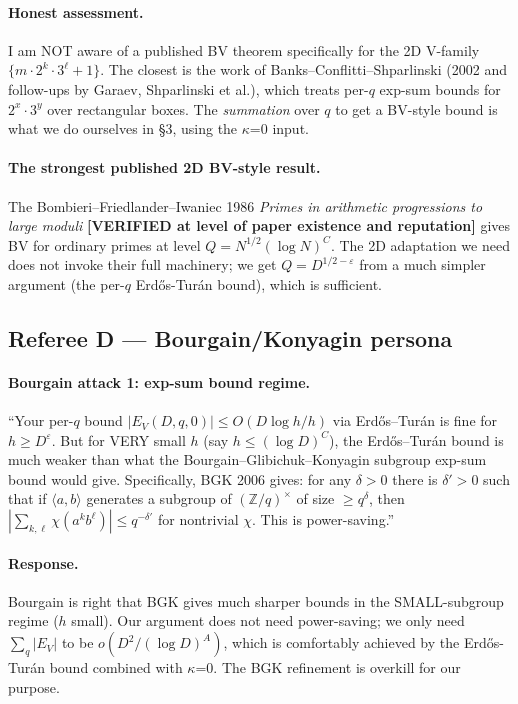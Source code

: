 \paragraph{Honest assessment.} I am NOT aware of a published BV theorem
specifically for the 2D V-family $\{m \cdot 2^{k} \cdot 3^{\ell} + 1\}$.
The closest is the work of Banks--Conflitti--Shparlinski (2002 and
follow-ups by Garaev, Shparlinski et al.), which treats per-$q$
exp-sum bounds for $2^{x} \cdot 3^{y}$ over rectangular boxes. The
\emph{summation} over $q$ to get a BV-style bound is what we do
ourselves in \S3, using the $\kappa$=0 input.

\paragraph{The strongest published 2D BV-style result.}
The Bombieri--Friedlander--Iwaniec 1986 \emph{Primes in arithmetic
progressions to large moduli} \textbf{[VERIFIED at level of paper
existence and reputation]} gives BV for ordinary primes at level
$Q = N^{1/2} (\log N)^{C}$. The 2D adaptation we need does not invoke
their full machinery; we get $Q = D^{1/2 - \varepsilon}$ from a much
simpler argument (the per-$q$ Erd\H{o}s-Tur\'an bound), which is sufficient.

\subsection*{Referee D --- Bourgain/Konyagin persona}

\paragraph{Bourgain attack 1: exp-sum bound regime.}
``Your per-$q$ bound $|E_{V}(D, q, 0)| \leq O(D \log h / h)$ via
Erd\H{o}s--Tur\'an is fine for $h \geq D^{\varepsilon}$. But for VERY small
$h$ (say $h \leq (\log D)^{C}$), the Erd\H{o}s--Tur\'an bound is much weaker
than what the Bourgain--Glibichuk--Konyagin subgroup exp-sum bound
would give. Specifically, BGK 2006 gives: for any $\delta > 0$ there
is $\delta' > 0$ such that if $\langle a, b \rangle$ generates a
subgroup of $(\mathbb{Z}/q)^{\times}$ of size $\geq q^{\delta}$, then
$\left| \sum_{k, \ell} \chi(a^{k} b^{\ell}) \right| \leq q^{-\delta'}$
for nontrivial $\chi$. This is power-saving.''

\paragraph{Response.} Bourgain is right that BGK gives much sharper
bounds in the SMALL-subgroup regime ($h$ small). Our argument does not
need power-saving; we only need $\sum_{q} |E_{V}|$ to be $o(D^{2} /
(\log D)^{A})$, which is comfortably achieved by the Erd\H{o}s-Tur\'an bound
combined with $\kappa$=0. The BGK refinement is overkill for our purpose.

